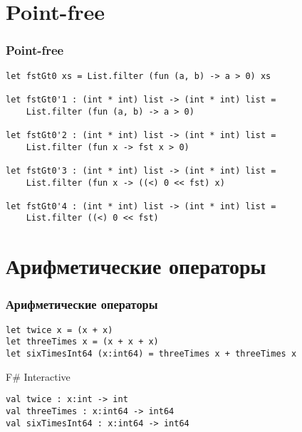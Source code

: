 \documentclass[xetex,mathserif,serif]{beamer}
\begin{document}
	\section{Point-free}
	
	\begin{frame}[fragile]
		\frametitle{Point-free}
		\begin{verbatim}
let fstGt0 xs = List.filter (fun (a, b) -> a > 0) xs

let fstGt0'1 : (int * int) list -> (int * int) list = 
    List.filter (fun (a, b) -> a > 0)

let fstGt0'2 : (int * int) list -> (int * int) list = 
    List.filter (fun x -> fst x > 0)

let fstGt0'3 : (int * int) list -> (int * int) list = 
    List.filter (fun x -> ((<) 0 << fst) x)

let fstGt0'4 : (int * int) list -> (int * int) list = 
    List.filter ((<) 0 << fst)
		\end{verbatim}
	\end{frame}

	\section{Арифметические операторы}

	\begin{frame}[fragile]
		\frametitle{Арифметические операторы}
		\begin{verbatim}
let twice x = (x + x)
let threeTimes x = (x + x + x)
let sixTimesInt64 (x:int64) = threeTimes x + threeTimes x
		\end{verbatim}

		\begin{alertblock}{F\# Interactive}
			\begin{verbatim}
val twice : x:int -> int
val threeTimes : x:int64 -> int64
val sixTimesInt64 : x:int64 -> int64
			\end{verbatim}
		\end{alertblock}
	\end{frame}
\end{document}
